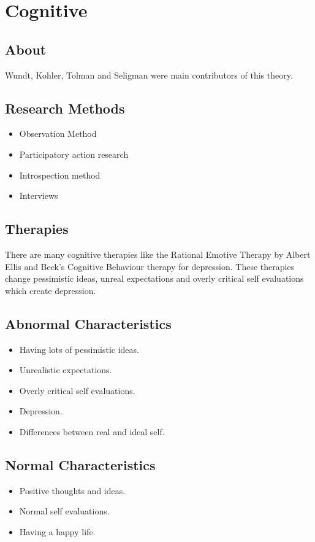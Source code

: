 \documentclass{article}
\begin{document}
	\section{Cognitive}
		\subsection{About}
			Wundt, Kohler, Tolman and Seligman were main contributors of this theory.
		\subsection{Research Methods}
			\begin{itemize}
				\item Observation Method
				\item Participatory action research
				\item Introspection method
				\item Interviews
			\end{itemize}
		\subsection{Therapies}
			There are many cognitive therapies like the Rational Emotive Therapy by Albert Ellis and Beck's Cognitive Behaviour therapy for depression.
			\newline
			These therapies change pessimistic ideas, unreal expectations and overly critical self evaluations which create depression.
		\subsection{Abnormal Characteristics}
			\begin{itemize}
				\item Having lots of pessimistic ideas.
				\item Unrealistic expectations.
				\item Overly critical self evaluations.
				\item Depression.
				\item Differences between real and ideal self.
			\end{itemize}
		\subsection{Normal Characteristics}
			\begin{itemize}
				\item Positive thoughts and ideas.
				\item Normal self evaluations.
				\item Having a happy life.
			\end{itemize}
\end{document}
